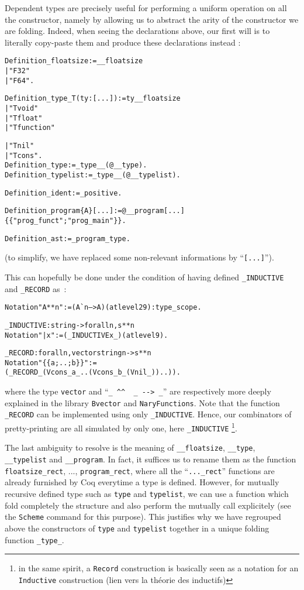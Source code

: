 \documentclass[a4paper, 11pt]{article}
\newenvironment{coq}
  {\selectlanguage{english} \begin{alltt}} %% 8.3pl1 (January 2011)
  {\end{alltt} \selectlanguage{francais}}
\begin{document}
Dependent types are precisely useful for performing a uniform operation on all the constructor, namely by allowing us to abstract the arity of the constructor we are folding. Indeed, when seeing the declarations above, our first will is to literally copy-paste them and produce these declarations instead :
\begin{coq}
Definition _floatsize := __floatsize 
  | "F32" 
  | "F64".

Definition _type_ T (ty : [...]) := ty _ _floatsize
  | "Tvoid"
  | "Tfloat"
  | "Tfunction"

  | "Tnil"
  | "Tcons".
  Definition _type := _type_ _ (@__type).
  Definition _typelist := _type_ _ (@__typelist).

Definition _ident := _positive.

Definition _program \{A\} [...] := @__program [...]
  \{\{ "prog_funct" ; "prog_main" \}\}.

Definition _ast := _program _type.
\end{coq}
(to simplify, we have replaced some non-relevant informations by ``\verb|[...]|'').

This can hopefully be done under the condition of having defined \verb|_INDUCTIVE| and \verb|_RECORD| as~:
\begin{coq}
  Notation "A ** n" := (A ^^ n --> A) (at level 29) : type_scope.

_INDUCTIVE : string -> forall n, s ** n
  Notation "| x" := (_INDUCTIVE x _) (at level 9).

_RECORD : forall n, vector string n -> s ** n
  Notation "\{\{ a ; .. ; b \}\}" := 
    (_RECORD _ (Vcons _ a _ .. (Vcons _ b _ (Vnil _)) ..)).
\end{coq}
where the type \verb|vector| and ``\verb|_ ^^  _ --> _|'' are respectively more deeply explained in the library \verb|Bvector| and \verb|NaryFunctions|.
Note that the function \verb|_RECORD| can be implemented using only \verb|_INDUCTIVE|. Hence, our combinators of pretty-printing are all simulated by only one, here \verb|_INDUCTIVE|
 \footnote{in the same spirit, a {\tt Record} construction is basically seen as a notation for an {\tt Inductive} construction (lien vers la théorie des inductifs)}.

The last ambiguity to resolve is the meaning of \verb|__floatsize|, \verb|__type|, \verb|__typelist| and \verb|__program|. In fact, it suffices us to rename them as the function \verb|floatsize_rect|, ..., \verb|program_rect|, where all the ``\verb|..._rect|'' functions are already furnished by Coq everytime a type is defined. However, for mutually recursive defined type such as \verb|type| and \verb|typelist|, we can use a function which fold completely the structure and also perform the mutually call explicitely (see the \verb|Scheme| command for this purpose). This justifies why we have regrouped above the constructors of \verb|type| and \verb|typelist| together in a unique folding function \verb|_type_|.
\end{document}
